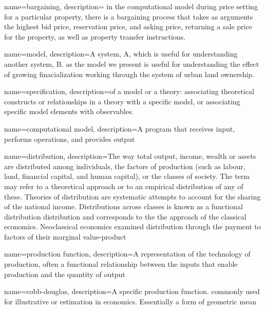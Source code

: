 {
name=bargaining,
description= {in the computational model during price setting for a particular property, there is a bargaining process that takes as arguments the highest bid price, reservation price, and asking price, returning a sale price for the property, as well as property transfer instructions.}
}


{
name=model,
description={A system, A, which is useful for understanding another system, B. as the model we present is useful for understanding the effect of growing finacialization working through the system of urban land ownership. }
}

{
name=specification,
description={of a model or a theory: associating theoretical constructs or relationships in a theory with a specific model, or associating specific model elements with observables. }
}

{
name=computational model,
description={A program that receives input, performs operations, and provides output}
}

{
name=distribution,
description={The way total output, income, wealth or assets are distributed among individuals, the factors of production (such as labour, land, financial capital,  and human capital), or the classes of society. The term may refer to a theoretical approach  or to an empirical distribution of any of these. Theories of distribution are systematic attempts to account for the sharing of the national income.  Distributions across classes is known as a functional distribution distribution and  corresponds to the the approach of the \gls{classical economics}. Neoclassical economics examined distribution through the payment to factors of their \gls{marginal value-product} }
}

{
name=production function,
description={A representation of the technology of production, often a functional relationship between the inputs that enable production and the quantity of output}
}

{
name=cobb-douglas,
description={A specific production function. commonly used for illustrative or estimation in economics. Essentially a form of geometric mean}
}

